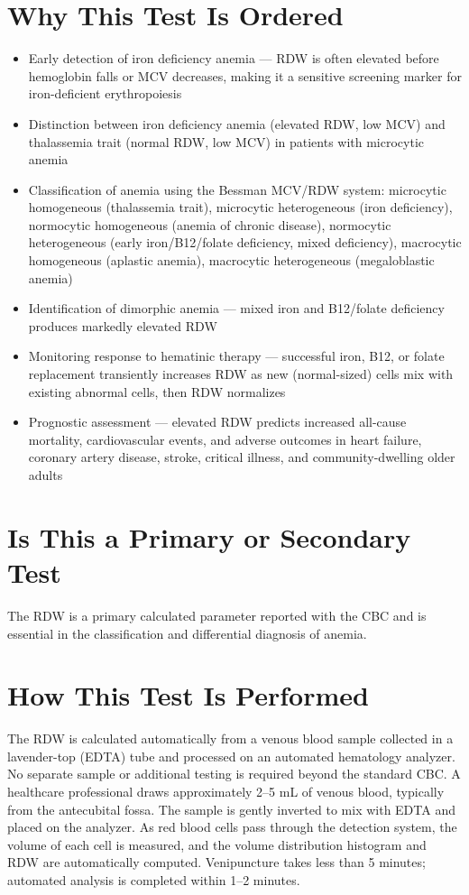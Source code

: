 \section*{Why This Test Is Ordered}
\begin{itemize}
  \item Early detection of iron deficiency anemia --- RDW is often elevated before hemoglobin falls or MCV decreases, making it a sensitive screening marker for iron-deficient erythropoiesis
  \item Distinction between iron deficiency anemia (elevated RDW, low MCV) and thalassemia trait (normal RDW, low MCV) in patients with microcytic anemia
  \item Classification of anemia using the Bessman MCV/RDW system: microcytic homogeneous (thalassemia trait), microcytic heterogeneous (iron deficiency), normocytic homogeneous (anemia of chronic disease), normocytic heterogeneous (early iron/B12/folate deficiency, mixed deficiency), macrocytic homogeneous (aplastic anemia), macrocytic heterogeneous (megaloblastic anemia)
  \item Identification of dimorphic anemia --- mixed iron and B12/folate deficiency produces markedly elevated RDW
  \item Monitoring response to hematinic therapy --- successful iron, B12, or folate replacement transiently increases RDW as new (normal-sized) cells mix with existing abnormal cells, then RDW normalizes
  \item Prognostic assessment --- elevated RDW predicts increased all-cause mortality, cardiovascular events, and adverse outcomes in heart failure, coronary artery disease, stroke, critical illness, and community-dwelling older adults
\end{itemize}

\section*{Is This a Primary or Secondary Test}
The RDW is a primary calculated parameter reported with the CBC and is essential in the classification and differential diagnosis of anemia.

\section*{How This Test Is Performed}
The RDW is calculated automatically from a venous blood sample collected in a lavender-top (EDTA) tube and processed on an automated hematology analyzer. No separate sample or additional testing is required beyond the standard CBC. A healthcare professional draws approximately 2--5 mL of venous blood, typically from the antecubital fossa. The sample is gently inverted to mix with EDTA and placed on the analyzer. As red blood cells pass through the detection system, the volume of each cell is measured, and the volume distribution histogram and RDW are automatically computed. Venipuncture takes less than 5 minutes; automated analysis is completed within 1--2 minutes.

